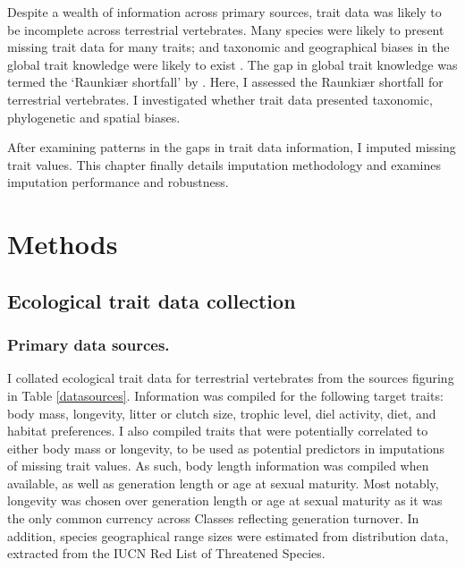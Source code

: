 Despite a wealth of information across primary sources, trait data was likely to be incomplete across terrestrial vertebrates. Many species were likely to present missing trait data for many traits; and taxonomic and geographical biases in the global trait knowledge were likely to exist \citep{Hortal2014, Gonzalez-Suarez2012}. The gap in global trait knowledge was termed the `Raunki{\ae}r shortfall' by \citet{Hortal2014}. Here, I assessed the Raunki{\ae}r shortfall for terrestrial vertebrates. I investigated whether trait data presented taxonomic, phylogenetic and spatial biases.  

After examining patterns in the gaps in trait data information, I imputed missing trait values. This chapter finally details imputation methodology and examines imputation performance and robustness.



\section{Methods}

\subsection{Ecological trait data collection}

\subsubsection{Primary data sources.}
I collated ecological trait data for terrestrial vertebrates from the sources figuring in Table \ref{datasources}. Information was compiled for the following target traits: body mass, longevity, litter or clutch size, trophic level, diel activity, diet, and habitat preferences. I also compiled traits that were potentially correlated to either body mass or longevity, to be used as potential predictors in imputations of missing trait values. As such, body length information was compiled when available, as well as generation length or age at sexual maturity. Most notably, longevity was chosen over generation length or age at sexual maturity as it was the only common currency across Classes reflecting generation turnover. In addition, species geographical range sizes were estimated from distribution data, extracted from the IUCN Red List of Threatened Species.

